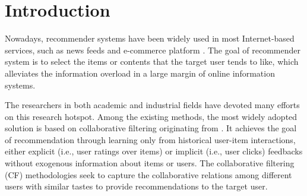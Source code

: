 

\chapter{Introduction}
\label{sec:intro}
Nowadays, recommender systems have been widely used in most Internet-based services, such as news feeds \cite{wang2017dynamic,liu2010personalized} and e-commerce platform \cite{rendle2010factorizing}.
The goal of recommender system is to select the items or contents that the target user tends to like, which alleviates the information overload in a large margin \cite{zhang2017deep} of online information systems.

The researchers in both academic and industrial fields have devoted many efforts on this research hotspot.
Among the existing methods, the most widely adopted solution is based on collaborative filtering originating from \cite{goldberg1992using}.
It achieves the goal of recommendation through learning only from historical user-item interactions, either explicit (i.e., user ratings over items) or implicit (i.e., user clicks) feedbacks \cite{zhang2017deep} without exogenous information about items or users.
The collaborative filtering (CF) methodologies seek to capture the collaborative relations among different users with similar tastes \cite{koren2008factorization} to provide recommendations to the target user.

